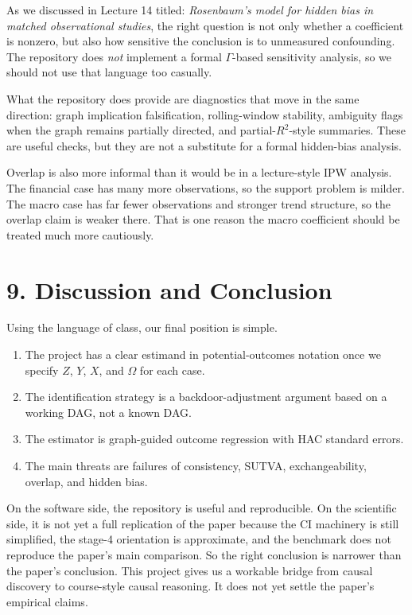 \documentclass[12pt]{article}
\begin{document}
As we discussed in Lecture 14 titled: \textit{Rosenbaum's model for hidden bias in matched
observational studies}, the right question is not only whether a coefficient is nonzero, but also
how sensitive the conclusion is to unmeasured confounding. The repository does \emph{not} implement
a formal \(\Gamma\)-based sensitivity analysis, so we should not use that language too casually.

What the repository does provide are diagnostics that move in the same direction: graph implication
falsification, rolling-window stability, ambiguity flags when the graph remains partially directed,
and partial-\(R^2\)-style summaries. These are useful checks, but they are not a substitute for a
formal hidden-bias analysis.

Overlap is also more informal than it would be in a lecture-style IPW analysis. The financial case
has many more observations, so the support problem is milder. The macro case has far fewer
observations and stronger trend structure, so the overlap claim is weaker there. That is one reason
the macro coefficient should be treated much more cautiously.

\section*{9. Discussion and Conclusion}

Using the language of class, our final position is simple.

\begin{enumerate}[leftmargin=1.5em]
\item The project has a clear estimand in potential-outcomes notation once we specify \(Z\), \(Y\),
\(X\), and \(\Omega\) for each case.
\item The identification strategy is a backdoor-adjustment argument based on a working DAG, not a
known DAG.
\item The estimator is graph-guided outcome regression with HAC standard errors.
\item The main threats are failures of consistency, SUTVA, exchangeability, overlap, and hidden
bias.
\end{enumerate}

On the software side, the repository is useful and reproducible. On the scientific side, it is not
yet a full replication of the paper because the CI machinery is still simplified, the stage-4
orientation is approximate, and the benchmark does not reproduce the paper's main comparison. So
the right conclusion is narrower than the paper's conclusion. This project gives us a workable
bridge from causal discovery to course-style causal reasoning. It does not yet settle the paper's
empirical claims.
\end{document}

